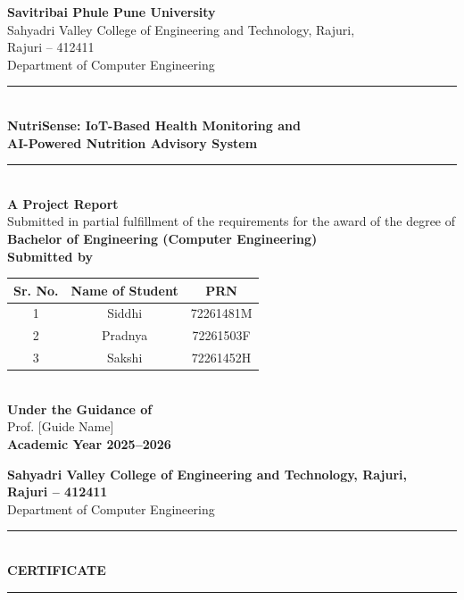 \documentclass[12pt,a4paper]{report}
\begin{document}
\begin{titlepage}
\begin{center}
\vspace*{1cm}

{\large\textbf{Savitribai Phule Pune University}}\\[0.5cm]
{\large Sahyadri Valley College of Engineering and Technology, Rajuri,\\Rajuri -- 412411}\\[0.3cm]
{\normalsize Department of Computer Engineering}\\[1.5cm]

\rule{\textwidth}{1.5pt}\\[0.5cm]
{\LARGE\textbf{NutriSense: IoT-Based Health Monitoring and\\AI-Powered Nutrition Advisory System}}\\[0.3cm]
\rule{\textwidth}{1.5pt}\\[1.5cm]

{\large\textbf{A Project Report}}\\[0.3cm]
{\normalsize Submitted in partial fulfillment of the requirements for the award of the degree of}\\[0.3cm]
{\large\textbf{Bachelor of Engineering (Computer Engineering)}}\\[1.5cm]

{\normalsize\textbf{Submitted by}}\\[0.3cm]

\begin{tabular}{|c|c|c|}
\hline
\textbf{Sr. No.} & \textbf{Name of Student} & \textbf{PRN} \\
\hline
1 & Siddhi & 72261481M \\
\hline
2 & Pradnya & 72261503F \\
\hline
3 & Sakshi & 72261452H \\
\hline
\end{tabular}\\[1.5cm]

{\normalsize\textbf{Under the Guidance of}}\\[0.3cm]
{\normalsize Prof. [Guide Name]}\\[2cm]

{\large\textbf{Academic Year 2025--2026}}

\end{center}
\end{titlepage}

\newpage
\thispagestyle{empty}
\begin{center}
{\large\textbf{Sahyadri Valley College of Engineering and Technology, Rajuri,\\Rajuri -- 412411}}\\[0.3cm]
{\normalsize Department of Computer Engineering}\\[1.5cm]

\rule{\textwidth}{1.5pt}\\[0.5cm]
{\LARGE\textbf{CERTIFICATE}}\\[0.3cm]
\rule{\textwidth}{1.5pt}\\[1.5cm]
\end{center}
\end{document}
